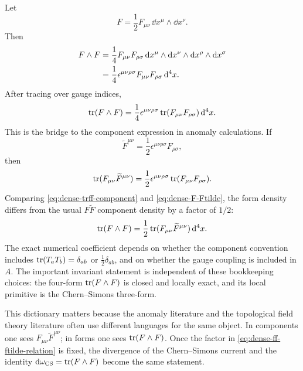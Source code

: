 Let
\begin{equation}
  F=\frac12F_{\mu\nu}\,\dd x^\mu\wedge \dd x^\nu.
  \label{eq:dense-F-components}
\end{equation}
Then
\begin{align}
  F\wedge F
  &=
  \frac14
  F_{\mu\nu}F_{\rho\sigma}
  \,\mathrm{d} x^\mu\wedge\mathrm{d} x^\nu\wedge\mathrm{d} x^\rho\wedge\mathrm{d} x^\sigma
  \notag\\
  &=
  \frac14
  \epsilon^{\mu\nu\rho\sigma}
  F_{\mu\nu}F_{\rho\sigma}
  \,\mathrm{d}^4x.
  \label{eq:dense-ff-component}
\end{align}
After tracing over gauge indices,
\begin{equation}
  \operatorname{tr}(F\wedge F)
  =
  \frac14
  \epsilon^{\mu\nu\rho\sigma}
  \operatorname{tr}(F_{\mu\nu}F_{\rho\sigma})\,\mathrm{d}^4x.
  \label{eq:dense-trff-component}
\end{equation}
This is the bridge to the component expression in anomaly calculations. If
\begin{equation}
  \widetilde F^{\mu\nu}
  =
  \frac12\epsilon^{\mu\nu\rho\sigma}F_{\rho\sigma},
  \label{eq:dense-dual-F}
\end{equation}
then
\begin{equation}
  \operatorname{tr}(F_{\mu\nu}\widetilde F^{\mu\nu})
  =
  \frac12\epsilon^{\mu\nu\rho\sigma}
  \operatorname{tr}(F_{\mu\nu}F_{\rho\sigma}).
  \label{eq:dense-F-Ftilde}
\end{equation}
Comparing \eqref{eq:dense-trff-component} and \eqref{eq:dense-F-Ftilde}, the form density differs from the usual $F\widetilde F$ component density by a factor of $1/2$:
\begin{equation}
  \operatorname{tr}(F\wedge F)
  =
  \frac12
  \operatorname{tr}(F_{\mu\nu}\widetilde F^{\mu\nu})\,\mathrm{d}^4x.
  \label{eq:dense-ff-ftilde-relation}
\end{equation}
The exact numerical coefficient depends on whether the component convention includes $\operatorname{tr}(T_aT_b)=\delta_{ab}$ or $\frac12\delta_{ab}$, and on whether the gauge coupling is included in $A$. The important invariant statement is independent of these bookkeeping choices: the four-form $\operatorname{tr}(F\wedge F)$ is closed and locally exact, and its local primitive is the Chern--Simons three-form.

This dictionary matters because the anomaly literature and the topological field theory literature often use different languages for the same object. In components one sees $F_{\mu\nu}\widetilde F^{\mu\nu}$; in forms one sees $\operatorname{tr}(F\wedge F)$. Once the factor in \eqref{eq:dense-ff-ftilde-relation} is fixed, the divergence of the Chern--Simons current and the identity $\mathrm{d}\omega_{\operatorname{CS}}=\operatorname{tr}(F\wedge F)$ become the same statement.

